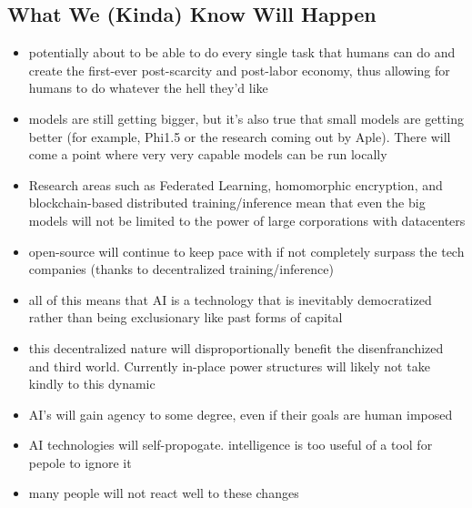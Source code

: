 \documentclass{article}
\begin{document}
\subsection{What We (Kinda) Know Will Happen}
\label{sec:WhatWeKindaKnowWillHappen}
\begin{itemize}
    \item potentially about to be able to do every single task that humans can do and create the first-ever post-scarcity and post-labor economy, thus allowing for humans to do whatever the hell they'd like
    \item models are still getting bigger, but it's also true that small models are getting better (for example, Phi1.5 or the research coming out by Aple). There will come a point where very very capable models can be run locally
    \item Research areas such as Federated Learning, homomorphic encryption, and blockchain-based distributed training/inference mean that even the big models will not be limited to the power of large corporations with datacenters
    \item open-source will continue to keep pace with if not completely surpass the tech companies (thanks to decentralized training/inference)
    \item all of this means that AI is a technology that is inevitably democratized rather than being exclusionary like past forms of capital
    \item this decentralized nature will disproportionally benefit the disenfranchized and third world. Currently in-place power structures will likely not take kindly to this dynamic
    \item AI's will gain agency to some degree, even if their goals are human imposed
    \item AI technologies will self-propogate. intelligence is too useful of a tool for pepole to ignore it
    \item many people will not react well to these changes
\end{itemize}
\end{document}
